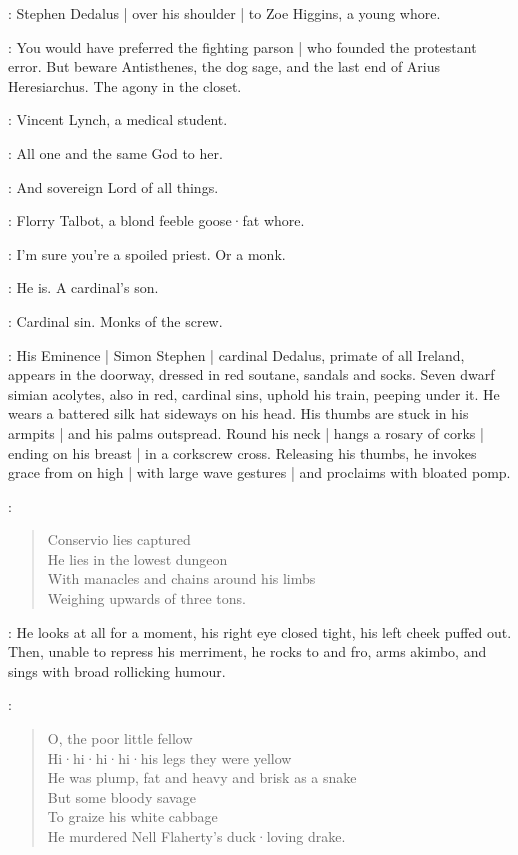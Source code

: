
:
Stephen Dedalus |
over his shoulder |
to Zoe Higgins,
a young whore.

\Stephen:
You would have preferred the fighting parson |
who founded the protestant error.
But beware Antisthenes,
the dog sage,
and the last end of Arius Heresiarchus.
The agony in the closet.

:
Vincent Lynch,
a medical student.

\Lynch:
All one and the same God to her.

\Stephen:
And sovereign Lord of all things.

:
Florry Talbot,
a blond feeble goose·fat whore.

\Florry:
I'm sure you're a spoiled priest.
Or a monk.

\Lynch:
He is.
A cardinal's son.

\Stephen:
Cardinal sin.
Monks of the screw.

:
His Eminence |
Simon Stephen |
cardinal Dedalus,
primate of all Ireland,
appears in the doorway,
dressed in red soutane,
sandals and socks.
Seven dwarf simian acolytes,
also in red,
cardinal sins,
uphold his train,
peeping under it.
He wears a battered silk hat sideways on his head.
His thumbs are stuck in his armpits |
and his palms outspread.
Round his neck |
hangs a rosary of corks |
ending on his breast |
in a corkscrew cross.
%
Releasing his thumbs,
he invokes grace from on high |
with large wave gestures |
and proclaims with bloated pomp.

\Cardinal:
\begin{verse}
    Conservio lies captured\\
    He lies in the lowest dungeon\\
    With manacles and chains around his limbs\\
    Weighing upwards of three tons.
\end{verse}

:
He looks at all for a moment,
his right eye closed tight,
his left cheek puffed out.
Then,
unable to repress his merriment,
he rocks to and fro,
%
arms akimbo,
and sings with broad rollicking humour.

\Cardinal:
\begin{verse}
    O, the poor little fellow\\
    Hi·hi·hi·hi·his legs they were yellow\\
    He was plump, fat and heavy and brisk as a snake\\
    But some bloody savage\\
    To graize his white cabbage\\
    He murdered Nell Flaherty's duck·loving drake.
\end{verse}

